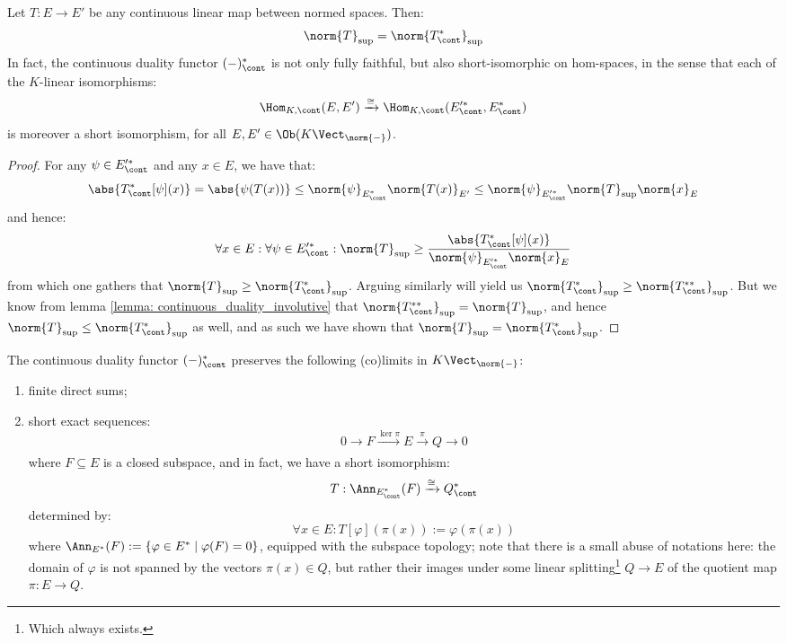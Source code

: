         \begin{proposition} \label{prop: transposition_norms}
            Let $T: E \to E'$ be any continuous linear map between normed spaces. Then:
                $$\norm{T}_{\sup} = \norm{T^*_{\cont}}_{\sup}$$
            In fact, the continuous duality functor $(-)_{\cont}^*$ is not only fully faithful, but also short-isomorphic on hom-spaces, in the sense that each of the $K$-linear isomorphisms:
                $$\Hom_{K, \cont}(E, E') \xrightarrow[]{\cong} \Hom_{K, \cont}(E'^*_{\cont}, E^*_{\cont})$$
            is moreover a short isomorphism, for all $E, E' \in \Ob( K\-\Vect_{\norm{-}} )$.
        \end{proposition}
            \begin{proof}
                For any $\psi \in E'^*_{\cont}$ and any $x \in E$, we have that:
                    $$\abs{ T^*_{\cont}[\psi](x) } = \abs{\psi(T(x))} \leq \norm{\psi}_{E^*_{\cont}} \norm{T(x)}_{E'} \leq \norm{\psi}_{E'^*_{\cont}} \norm{T}_{\sup} \norm{x}_E$$
                and hence:
                    $$\forall x \in E: \forall \psi \in E'^*_{\cont}: \norm{T}_{\sup} \geq \frac{ \abs{ T^*_{\cont}[\psi](x) } }{\norm{\psi}_{E'^*_{\cont}} \norm{x}_E }$$
                from which one gathers that $\norm{T}_{\sup} \geq \norm{T^*_{\cont}}_{\sup}$. Arguing similarly will yield us $\norm{T^*_{\cont}}_{\sup} \geq \norm{T^{**}_{\cont}}_{\sup}$. But we know from lemma \ref{lemma: continuous_duality_involutive} that $\norm{T^{**}_{\cont}}_{\sup} = \norm{T}_{\sup}$, and hence $\norm{T}_{\sup} \leq \norm{T^*_{\cont}}_{\sup}$ as well, and as such we have shown that $\norm{T}_{\sup} = \norm{T^*_{\cont}}_{\sup}$.
            \end{proof}
        \begin{proposition} \label{prop: properties_of_continuous_duals}
            The continuous duality functor $(-)^*_{\cont}$ preserves the following (co)limits in $K\-\Vect_{\norm{-}}$:
            \begin{enumerate}
                \item finite direct sums;
                \item short exact sequences:
                    $$0 \to F \xrightarrow[]{\ker \pi} E \xrightarrow[]{\pi} Q \to 0$$
                where $F \subseteq E$ is a closed subspace, and in fact, we have a short isomorphism:
                    $$T: \Ann_{E^*_{\cont}}(F) \xrightarrow[]{\cong} Q^*_{\cont}$$
                determined by:
                    $$\forall x \in E: T[\varphi]( \pi(x) ) := \varphi(\pi(x))$$
                where $\Ann_{E^*}(F) := \{ \varphi \in E^* \mid \varphi(F) = 0 \}$, equipped with the subspace topology; note that there is a small abuse of notations here: the domain of $\varphi$ is not spanned by the vectors $\pi(x) \in Q$, but rather their images under some linear splitting\footnote{Which always exists.} $Q \to E$ of the quotient map $\pi: E \to Q$.
            \end{enumerate}
        \end{proposition}
